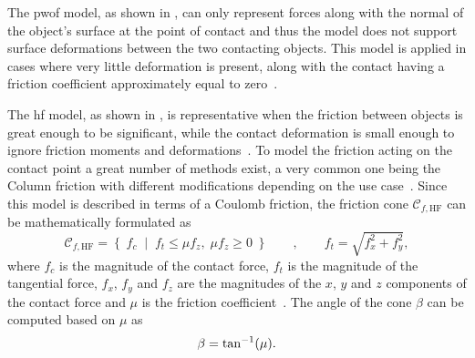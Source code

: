 The \gls{pwof} model, as shown in , can only represent forces along with the normal of the object's surface at the point of contact and thus the model does not support surface deformations between the two contacting objects. This model is applied in cases where very little deformation is present, along with the contact having a friction coefficient approximately equal to zero~\cite[Chapter 38]{handbook-of-robotics}.\medskip


The \gls{hf} model, as shown in , is representative when the friction between objects is great enough to be significant, while the contact deformation is small enough to ignore friction moments and deformations~\cite[Chapter 38]{handbook-of-robotics}. To model the friction acting on the contact point a great number of methods exist, a very common one being the Column friction with different modifications depending on the use case~\cite{modelling-of-joint-friction-in-robotic-manipulators-with-gear-transmissions}. Since this model is described in terms of a Coulomb friction, the friction cone $\mathcal{C}_{f,\text{HF}}$ can be mathematically formulated as
%
\begin{equation} 
	\mathcal{C}_{f,\text{HF}} = \left\{ \; f_c\; \middle|\; f_{t} \le \mu f_z,\; \mu f_z \ge 0 \; \right\} \qquad , \qquad f_t = \sqrt{f_x^2 + f_y^2},
	\label{eq:hf}
\end{equation}
where $f_c$ is the magnitude of the contact force, $f_t$ is the magnitude of the tangential force, $f_x$, $f_y$ and $f_z$ are the magnitudes of the $x$, $y$ and $z$ components of the contact force and $\mu$ is the friction coefficient~\cite[Chapter 37]{handbook-of-robotics}. The angle of the cone $\beta$ can be computed based on $\mu$ as
%
\begin{equation} 
	\beta = \tan^{-1} (\mu).
	\label{eq:hf-cone-angle}
\end{equation}

